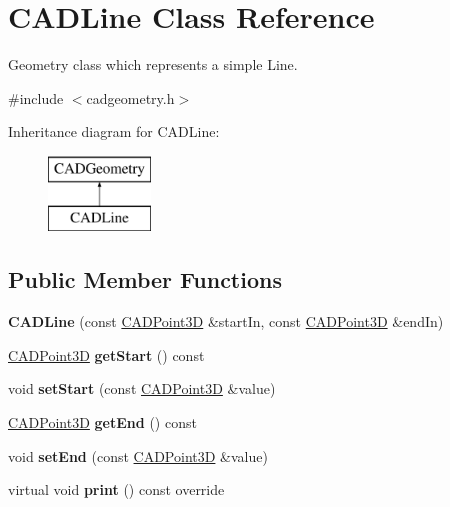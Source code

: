 \hypertarget{class_c_a_d_line}{}\section{C\+A\+D\+Line Class Reference}
\label{class_c_a_d_line}


Geometry class which represents a simple Line.  




{\ttfamily \#include $<$cadgeometry.\+h$>$}

Inheritance diagram for C\+A\+D\+Line\+:\begin{figure}[H]
\begin{center}
\leavevmode
\includegraphics[height=2.000000cm]{class_c_a_d_line}
\end{center}
\end{figure}
\subsection*{Public Member Functions}
\begin{DoxyCompactItemize}
\item 
{\bfseries C\+A\+D\+Line} (const \hyperlink{class_c_a_d_point3_d}{C\+A\+D\+Point3D} \&start\+In, const \hyperlink{class_c_a_d_point3_d}{C\+A\+D\+Point3D} \&end\+In)\hypertarget{class_c_a_d_line_ac1b7a77ef2d8e853b6356554ddc0dcdc}{}\label{class_c_a_d_line_ac1b7a77ef2d8e853b6356554ddc0dcdc}

\item 
\hyperlink{class_c_a_d_point3_d}{C\+A\+D\+Point3D} {\bfseries get\+Start} () const \hypertarget{class_c_a_d_line_a721e80cf9219fb7acf24e33aa612218a}{}\label{class_c_a_d_line_a721e80cf9219fb7acf24e33aa612218a}

\item 
void {\bfseries set\+Start} (const \hyperlink{class_c_a_d_point3_d}{C\+A\+D\+Point3D} \&value)\hypertarget{class_c_a_d_line_a2ba1be49ca6cb424f4061feb72c7c63b}{}\label{class_c_a_d_line_a2ba1be49ca6cb424f4061feb72c7c63b}

\item 
\hyperlink{class_c_a_d_point3_d}{C\+A\+D\+Point3D} {\bfseries get\+End} () const \hypertarget{class_c_a_d_line_a0be6b3753da26f84a0c6f054ae3ce464}{}\label{class_c_a_d_line_a0be6b3753da26f84a0c6f054ae3ce464}

\item 
void {\bfseries set\+End} (const \hyperlink{class_c_a_d_point3_d}{C\+A\+D\+Point3D} \&value)\hypertarget{class_c_a_d_line_afe32345b45ce869e514ce6c03ed08f54}{}\label{class_c_a_d_line_afe32345b45ce869e514ce6c03ed08f54}

\item 
virtual void {\bfseries print} () const  override\hypertarget{class_c_a_d_line_ab5a0b4d286c07df3332e6926508774ff}{}\label{class_c_a_d_line_ab5a0b4d286c07df3332e6926508774ff}

\end{DoxyCompactItemize}
